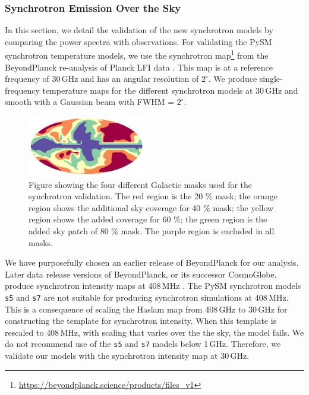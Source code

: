 \documentclass[twocolumn]{aastex631}
\begin{document}

\subsubsection{Synchrotron Emission Over the Sky} \label{sec:sync_validation}

In this section, we detail the validation of the new synchrotron models by comparing the power spectra with observations. For validating the PySM synchrotron temperature models, we use the synchrotron map\footnote{\url{https://beyondplanck.science/products/files\_v1}} from the BeyondPlanck re-analysis of Planck LFI data \citep{Andersen:2023}. This map is at a reference frequency of 30\,GHz and has an angular resolution of $2^\circ$. We produce single-frequency temperature maps for the different synchrotron models at 30\,GHz and smooth with a Gaussian beam with FWHM = $2^\circ$.

\begin{figure}
    \centering
    \includegraphics[width=0.46\textwidth]{figures/SYNC_mask_stack.png}
    \caption{Figure showing the four different Galactic masks used for the synchrotron validation. The red region is the 20 \% mask; the orange region shows the additional sky coverage for 40 \% mask; the yellow region shows the added coverage for 60 \%; the green region is the added sky patch of 80 \% mask. The purple region is excluded in all masks. }
    \label{fig:sync_masks}
\end{figure}

We have purposefully chosen an earlier release of BeyondPlanck for our analysis. Later data release versions of BeyondPlanck, or its successor CosmoGlobe, produce synchrotron intensity maps at 408\,MHz \citep{Watts:2023a}. The PySM synchrotron models \texttt{s5} and \texttt{s7} are not suitable for producing synchrotron simulations at 408\,MHz. This is a consequence of scaling the Haslam map from 408\,GHz to 30\,GHz for constructing the template for synchrotron intensity. When this template is rescaled to 408\,MHz, with scaling that varies over the the sky, the model fails. We do not recommend use of the \texttt{s5} and \texttt{s7} models below 1\,GHz. Therefore, we validate our models with the synchrotron intensity map at 30\,GHz.
\end{document}
